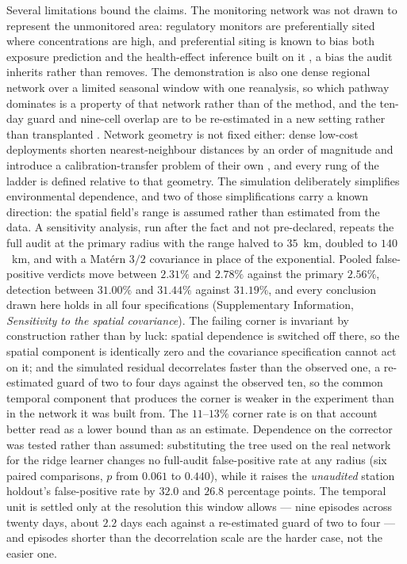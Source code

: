 Several limitations bound the claims. The monitoring network was not drawn to represent the unmonitored area: regulatory monitors are preferentially sited where concentrations are high, and preferential siting is known to bias both exposure prediction and the health-effect inference built on it \citep{lee2015preferential}, a bias the audit inherits rather than removes. The demonstration is also one dense regional \pmten{} network over
a limited seasonal window with one reanalysis, so which pathway dominates is a property of that
network rather than of the method, and the ten-day guard and nine-cell overlap are to be
re-estimated in a new setting rather than transplanted \citep{bae2025}. Network geometry is not
fixed either: dense low-cost deployments shorten nearest-neighbour distances by an order of
magnitude and introduce a calibration-transfer problem of their own
\citep{vanzoest2019,siddiqui2024}, and every rung of the ladder is defined relative to that
geometry. The simulation deliberately simplifies environmental dependence, and two of those
simplifications carry a known direction: the spatial field's range is assumed rather than
estimated from the data. A sensitivity analysis, run after the fact and not pre-declared, repeats
the full audit at the primary radius with the range halved to $35$~km, doubled to $140$~km, and
with a Mat\'ern $3/2$ covariance in place of the exponential. Pooled false-positive verdicts move
between $2.31\%$ and $2.78\%$ against the primary $2.56\%$, detection between $31.00\%$ and
$31.44\%$ against $31.19\%$, and every conclusion drawn here holds in all four specifications
(Supplementary Information, \emph{Sensitivity to the spatial covariance}). The failing corner is
invariant by construction rather than by luck: spatial dependence is switched off there, so
the spatial component is identically zero and the covariance specification cannot act on it; and the simulated residual
decorrelates faster than the observed one, a re-estimated guard of two to four days against the
observed ten, so the common temporal component that produces the corner is weaker in the experiment
than in the network it was built from. The $11$--$13\%$ corner rate is on that account better read
as a lower bound than as an estimate. Dependence on the corrector was tested rather than assumed:
substituting the tree used on the real network for the ridge learner changes no full-audit
false-positive rate at any radius (six paired comparisons, $p$ from $0.061$ to $0.440$), while it
raises the \emph{unaudited} station holdout's false-positive rate by $32.0$ and $26.8$ percentage
points. The temporal unit is settled only at the resolution this window allows --- nine episodes
across twenty days, about $2.2$ days each against a re-estimated guard of two to four --- and
episodes shorter than the decorrelation scale are the harder case, not the easier one.

